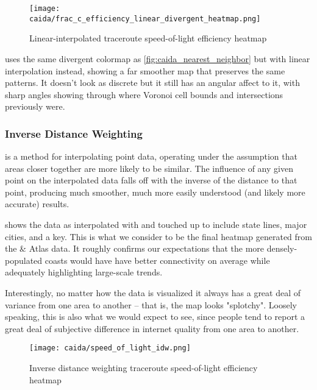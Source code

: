 \begin{figure}[htb]
    \centering
    \texttt{[image: caida/frac\_c\_efficiency\_linear\_divergent\_heatmap.png]}
    \caption{Linear-interpolated traceroute speed-of-light efficiency heatmap}
    \label{fig:caida_linear_interpolation}
\end{figure}

 uses the same divergent colormap as \cref{fig:caida_nearest_neighbor} but with linear interpolation instead, showing a far smoother map that preserves the same patterns. It doesn't look as discrete but it still has an angular affect to it, with sharp angles showing through where Voronoi cell bounds and intersections previously were.

\subsubsection{Inverse Distance Weighting}

\IDW is a method for interpolating point data, operating under the assumption that areas closer together are more likely to be similar. The influence of any given point on the interpolated data falls off with the inverse of the distance to that point, producing much smoother, much more easily understood (and likely more accurate) results.

 shows the data as interpolated with \idw and touched up to include state lines, major cities, and a key. This is what we consider to be the final heatmap generated from the \caida \& \ripe Atlas data. It roughly confirms our expectations that the more densely-populated coasts would have have better connectivity on average while adequately highlighting large-scale trends.

Interestingly, no matter how the data is visualized it always has a great deal of variance from one area to another -- that is, the map looks "splotchy". Loosely speaking, this is also what we would expect to see, since people tend to report a great deal of subjective difference in internet quality from one area to another.

\begin{figure}[htb]
    \centering
    \texttt{[image: caida/speed\_of\_light\_idw.png]}
    \caption{Inverse distance weighting traceroute speed-of-light efficiency heatmap}
    \label{fig:caida_idw_heatmap}
\end{figure}
